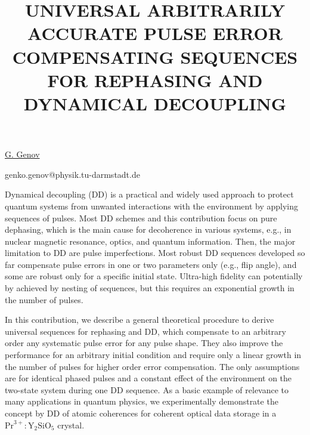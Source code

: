 \title{UNIVERSAL ARBITRARILY ACCURATE PULSE ERROR COMPENSATING SEQUENCES FOR REPHASING AND DYNAMICAL DECOUPLING}

\underline{G. Genov} 

{\normalsize{\vspace{-4mm}
\darmstadt

\email genko.genov@physik.tu-darmstadt.de}}

Dynamical decoupling (DD) is a practical and widely used approach to protect quantum systems from unwanted interactions with the environment by applying sequences of pulses. Most DD schemes and this contribution focus on pure dephasing, which is the main cause for decoherence in various systems, e.g., in nuclear magnetic resonance, optics, and quantum information. Then, the major limitation to DD are pulse imperfections. Most robust DD sequences developed so far compensate pulse errors in one or two parameters only (e.g., flip angle), and some are robust only for a specific initial state. Ultra-high fidelity can potentially by achieved by nesting of sequences, but this requires an exponential growth in the number of pulses.

In this contribution, we describe a general theoretical procedure to derive universal sequences for rephasing and DD, which compensate to an arbitrary order any systematic pulse error for any pulse shape. They also improve the performance for an arbitrary initial condition and require only a linear growth in the number of pulses for higher order error compensation. The only assumptions are for identical phased pulses and a constant effect of the environment on the two-state system during one DD sequence. As a basic example of relevance to many applications in quantum physics, we experimentally demonstrate the concept by DD of atomic coherences for coherent optical data storage in a $\mathrm{Pr}^{3+}:\mathrm{Y}_2\mathrm{SiO}_5$ crystal.


\vspace{\baselineskip} 